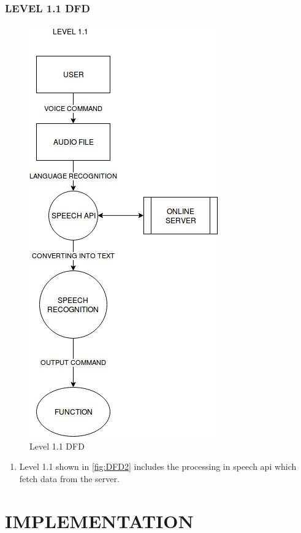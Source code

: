 \documentclass[11pt]{report} %
\begin{document}
\subsection{LEVEL 1.1 DFD}
\label{subsec:LEVEL 2 DFD}
\begin{figure}[h]
	\centering
	\includegraphics[width=0.5\linewidth]{figures/DFD2.jpg}
	\caption{Level 1.1 DFD}
	\label{fig:DFD2}
\end{figure}

\begin{enumerate}
	\item Level 1.1 shown in \autoref{fig:DFD2} includes the processing in speech api which fetch data from the server.
\end{enumerate}

%


\chapter{IMPLEMENTATION}
\end{document}
